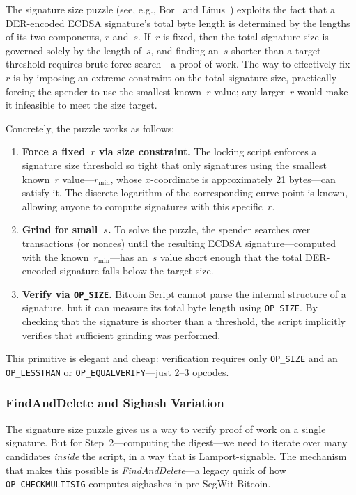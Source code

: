 \documentclass[11pt, a4paper]{article}
\begin{document}
The signature size puzzle (see, e.g., Bor~\cite{borco2024} and Linus~\cite{linus2024binohash}) exploits the fact that a DER-encoded ECDSA signature's total byte length is determined by the lengths of its two components, $r$ and~$s$. If~$r$ is fixed, then the total signature size is governed solely by the length of~$s$, and finding an~$s$ shorter than a target threshold requires brute-force search---a proof of work. The way to effectively fix~$r$ is by imposing an extreme constraint on the total signature size, practically forcing the spender to use the smallest known~$r$ value; any larger~$r$ would make it infeasible to meet the size target.

Concretely, the puzzle works as follows:

\begin{enumerate}
    \item \textbf{Force a fixed~$r$ via size constraint.} The locking script enforces a signature size threshold so tight that only signatures using the smallest known~$r$ value---$r_{\min}$, whose $x$-coordinate is approximately 21 bytes---can satisfy it. The discrete logarithm of the corresponding curve point is known, allowing anyone to compute signatures with this specific~$r$.

    \item \textbf{Grind for small~$s$.} To solve the puzzle, the spender searches over transactions (or nonces) until the resulting ECDSA signature---computed with the known~$r_{\min}$---has an~$s$ value short enough that the total DER-encoded signature falls below the target size.

    \item \textbf{Verify via \texttt{OP\_SIZE}.} Bitcoin Script cannot parse the internal structure of a signature, but it can measure its total byte length using \texttt{OP\_SIZE}. By checking that the signature is shorter than a threshold, the script implicitly verifies that sufficient grinding was performed.
\end{enumerate}

This primitive is elegant and cheap: verification requires only \texttt{OP\_SIZE} and an \texttt{OP\_LESSTHAN} or \texttt{OP\_EQUALVERIFY}---just 2--3 opcodes.

\subsubsection{FindAndDelete and Sighash Variation}
\label{sec:findanddelete}

The signature size puzzle gives us a way to verify proof of work on a single signature. But for Step~2---computing the digest---we need to iterate over many candidates \emph{inside} the script, in a way that is Lamport-signable. The mechanism that makes this possible is \emph{FindAndDelete}---a legacy quirk of how \texttt{OP\_CHECKMULTISIG} computes sighashes in pre-SegWit Bitcoin.
\end{document}
